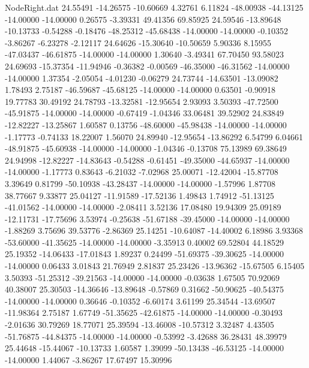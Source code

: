 \begin{filecontents}{NodeRight.dat}
  24.55491  -14.26575  -10.60669     4.32761    6.11824  -48.00938  -44.13125  -14.00000  -14.00000    0.26575   -3.39331   49.41356   69.85925
  24.59546  -13.89648  -10.13733    -0.54288   -0.18476  -48.25312  -45.68438  -14.00000  -14.00000   -0.10352   -3.86267   -6.23278   -2.12117
  24.64626  -15.30640  -10.50659     5.90336    8.15955  -47.03437  -46.61875  -14.00000  -14.00000    1.30640   -3.49341   67.70450   93.58023
  24.69693  -15.37354  -11.94946    -0.36382   -0.00569  -46.35000  -46.31562  -14.00000  -14.00000    1.37354   -2.05054   -4.01230   -0.06279
  24.73744  -14.63501  -13.09082     1.78493    2.75187  -46.59687  -45.68125  -14.00000  -14.00000    0.63501   -0.90918   19.77783   30.49192
  24.78793  -13.32581  -12.95654     2.93093    3.50393  -47.72500  -45.91875  -14.00000  -14.00000   -0.67419   -1.04346   33.06481   39.52902
  24.83849  -12.82227  -13.25867     1.60587    0.13756  -48.60000  -45.98438  -14.00000  -14.00000   -1.17773   -0.74133   18.22007    1.56070
  24.89940  -12.95654  -13.86292     6.54799    6.04661  -48.91875  -45.60938  -14.00000  -14.00000   -1.04346   -0.13708   75.13989   69.38649
  24.94998  -12.82227  -14.83643    -0.54288   -0.61451  -49.35000  -44.65937  -14.00000  -14.00000   -1.17773    0.83643   -6.21032   -7.02968
  25.00071  -12.42004  -15.87708     3.39649    0.81799  -50.10938  -43.28437  -14.00000  -14.00000   -1.57996    1.87708   38.77667    9.33877
  25.04127  -11.91589  -17.52136     1.49843    1.74912  -51.13125  -41.01562  -14.00000  -14.00000   -2.08411    3.52136   17.08480   19.94309
  25.09189  -12.11731  -17.75696     3.53974   -0.25638  -51.67188  -39.45000  -14.00000  -14.00000   -1.88269    3.75696   39.53776   -2.86369
  25.14251  -10.64087  -14.40002     6.18986    3.93368  -53.60000  -41.35625  -14.00000  -14.00000   -3.35913    0.40002   69.52804   44.18529
  25.19352  -14.06433  -17.01843     1.89237    0.24499  -51.69375  -39.30625  -14.00000  -14.00000    0.06433    3.01843   21.76949    2.81837
  25.23426  -13.96362  -15.67505     6.15405    3.50393  -51.25312  -39.21563  -14.00000  -14.00000   -0.03638    1.67505   70.92069   40.38007
  25.30503  -14.36646  -13.89648    -0.57869    0.31662  -50.90625  -40.54375  -14.00000  -14.00000    0.36646   -0.10352   -6.60174    3.61199
  25.34544  -13.69507  -11.98364     2.75187    1.67749  -51.35625  -42.61875  -14.00000  -14.00000   -0.30493   -2.01636   30.79269   18.77071
  25.39594  -13.46008  -10.57312     3.32487    4.43505  -51.76875  -44.84375  -14.00000  -14.00000   -0.53992   -3.42688   36.28431   48.39979
  25.44648  -15.44067  -10.13733     1.60587    1.39099  -50.13438  -46.53125  -14.00000  -14.00000    1.44067   -3.86267   17.67497   15.30996

\end{filecontents}
